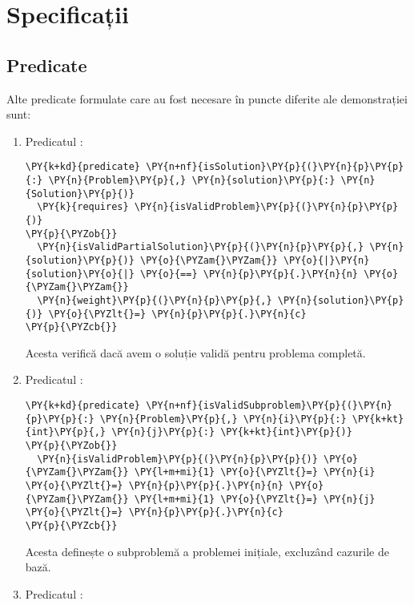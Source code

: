 \chapter{Specificații}
\begin{sloppypar}

\section{Predicate}
    Alte predicate formulate care au fost necesare în puncte diferite ale demonstrației sunt:
    \begin{enumerate}    
    \item Predicatul :
    \begin{Verbatim}[commandchars=\\\{\}]
\PY{k+kd}{predicate} \PY{n+nf}{isSolution}\PY{p}{(}\PY{n}{p}\PY{p}{:} \PY{n}{Problem}\PY{p}{,} \PY{n}{solution}\PY{p}{:} \PY{n}{Solution}\PY{p}{)}
  \PY{k}{requires} \PY{n}{isValidProblem}\PY{p}{(}\PY{n}{p}\PY{p}{)}
\PY{p}{\PYZob{}}
  \PY{n}{isValidPartialSolution}\PY{p}{(}\PY{n}{p}\PY{p}{,} \PY{n}{solution}\PY{p}{)} \PY{o}{\PYZam{}\PYZam{}} \PY{o}{|}\PY{n}{solution}\PY{o}{|} \PY{o}{==} \PY{n}{p}\PY{p}{.}\PY{n}{n} \PY{o}{\PYZam{}\PYZam{}}
  \PY{n}{weight}\PY{p}{(}\PY{n}{p}\PY{p}{,} \PY{n}{solution}\PY{p}{)} \PY{o}{\PYZlt{}=} \PY{n}{p}\PY{p}{.}\PY{n}{c}
\PY{p}{\PYZcb{}}
\end{Verbatim} 
    Acesta verifică dacă avem o soluție validă pentru problema completă.
    \item Predicatul :
    \begin{Verbatim}[commandchars=\\\{\}]
\PY{k+kd}{predicate} \PY{n+nf}{isValidSubproblem}\PY{p}{(}\PY{n}{p}\PY{p}{:} \PY{n}{Problem}\PY{p}{,} \PY{n}{i}\PY{p}{:} \PY{k+kt}{int}\PY{p}{,} \PY{n}{j}\PY{p}{:} \PY{k+kt}{int}\PY{p}{)}
\PY{p}{\PYZob{}}
  \PY{n}{isValidProblem}\PY{p}{(}\PY{n}{p}\PY{p}{)} \PY{o}{\PYZam{}\PYZam{}} \PY{l+m+mi}{1} \PY{o}{\PYZlt{}=} \PY{n}{i} \PY{o}{\PYZlt{}=} \PY{n}{p}\PY{p}{.}\PY{n}{n} \PY{o}{\PYZam{}\PYZam{}} \PY{l+m+mi}{1} \PY{o}{\PYZlt{}=} \PY{n}{j} \PY{o}{\PYZlt{}=} \PY{n}{p}\PY{p}{.}\PY{n}{c} 
\PY{p}{\PYZcb{}}
\end{Verbatim}
    Acesta definește o subproblemă a problemei inițiale, excluzând cazurile de bază.
    \item Predicatul :
    \begin{Verbatim}[commandchars=\\\{\}]

\end{Verbatim}
\end{enumerate}
\end{sloppypar}
